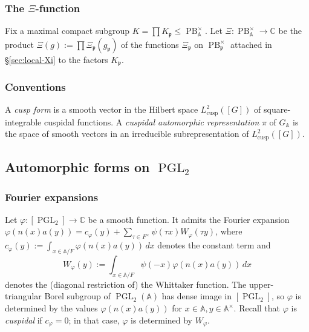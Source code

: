 \documentclass[reqno,10pt]{amsart}
\theoremstyle{plain} %
\theoremstyle{definition}
\theoremstyle{plain} %
\theoremstyle{remark}
\theoremstyle{itplain} %
\theoremstyle{remark} %
\renewcommand{\leq}{\leqslant}
\numberwithin{equation}{section}
\def\PB{\operatorname{PB}}
\def\PGL{\operatorname{PGL}}
\DeclareMathOperator{\cusp}{cusp}
\begin{document}
\subsubsection{The $\Xi$-function\label{sec:Xi-global}}
\label{sec-3-1-3}
Fix a maximal compact subgroup $K = \prod K_\mathfrak{p} \leq \PB^\times_{\mathbb{A}}$.  Let $\Xi : \PB^\times_{\mathbb{A}} \rightarrow \mathbb{C}$ be the product $\Xi(g) := \prod \Xi_\mathfrak{p}(g_\mathfrak{p})$ of the functions $\Xi_\mathfrak{p}$ on $\PB^\times_\mathfrak{p}$ attached in \S\ref{sec:local-Xi} to the factors $K_\mathfrak{p}$.

\subsubsection{Conventions}\label{sec:conventions-cusp-forms}
A \emph{cusp form} is a smooth vector in the Hilbert space $L^2_{\cusp}([G])$ of square-integrable cuspidal functions.  A \emph{cuspidal automorphic representation} $\pi$ of $G_\mathbb{A}$ is the space of smooth vectors in an irreducible subrepresentation of $L^2_{\cusp}([G])$.


\subsection{Automorphic forms on $\PGL_2$}
\label{sec-3-3}
\subsubsection{Fourier expansions}\label{sec:aut-forms-fourier-exp}
\label{sec-3-3-1}
Let $\varphi : [\PGL_2] \rightarrow \mathbb{C}$ be a smooth function.  It admits the Fourier expansion $\varphi(n(x) a(y)) = c_{\varphi}(y) + \sum_{\tau \in F^\times} \psi(\tau x) W_{\varphi}(\tau y)$, where $c_{\varphi}(y) := \int_{x \in \mathbb{A}/F} \varphi(n(x) a(y)) \,d x$ denotes the constant term and
\begin{equation}
W_{\varphi}(y) := \int_{x \in \mathbb{A}/F} \psi(- x) \varphi(n(x) a(y)) \,d x 
\end{equation}
denotes the (diagonal restriction of) the Whittaker function.  The upper-triangular Borel subgroup of $\PGL_2(\mathbb{A})$ has dense image in $[\PGL_2]$, so $\varphi$ is determined by the values $\varphi(n(x) a(y))$ for $x \in \mathbb{A}, y \in \mathbb{A}^\times$.  Recall that $\varphi$ is \emph{cuspidal} if $c_{\varphi} = 0$; in that case, $\varphi$ is determined by $W_\varphi$.
\end{document}
